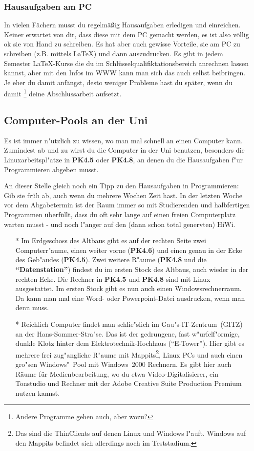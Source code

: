 \begin{center}
\subsubsection{Hausaufgaben am PC}
In vielen Fächern musst du regelmäßig Hausaufgaben erledigen und einreichen.
Keiner erwartet von dir, dass diese mit dem PC gemacht werden, es ist also
völlig ok sie von Hand zu schreiben. Es hat aber auch gewisse Vorteile, sie
am PC zu schreiben (z.B. mittels \LaTeX) und dann auszudrucken. Es gibt in
jedem Semester \LaTeX-Kurse die du im Schlüsselqualifiktationsbereich 
anrechnen lassen kannst, aber mit den Infos im WWW kann man sich das auch
selbst beibringen. Je eher du damit anfängst, desto weniger Probleme hast
du später, wenn du damit \footnote{Andere Programme gehen auch, aber
  wozu?} deine Abschlussarbeit aufsetzt.

\subsection{Computer-Pools an der Uni}
Es ist immer n"utzlich zu wissen, wo man mal schnell an einen Computer kann.
Zumindest ab und zu wirst du die Computer in der Uni benutzen, besonders
die Linuxarbeitspl"atze in \textbf{PK4.5} oder \textbf{PK4.8}, an denen du die Hausaufgaben f"ur
Programmieren abgeben musst.

{\small
An dieser Stelle gleich noch ein Tipp zu den Hausaufgaben in Programmieren:
Gib sie früh ab, auch wenn du mehrere Wochen Zeit hast. In der letzten Woche
vor dem Abgabetermin ist der Raum immer so mit Studierenden und halbfertigen
Programmen überfüllt, dass du oft sehr lange auf einen freien Computerplatz
warten musst - und noch l"anger auf den (dann schon total genervten) HiWi.
}

\begin{itemize}

\item[*] Im Erdgeschoss des Altbaus gibt es auf der rechten Seite zwei
Computerr"aume, einen weiter vorne (\textbf{PK4.6}) und einen genau in der Ecke
des Geb"audes (\textbf{PK4.5}). Zwei weitere R"aume (\textbf{PK4.8} und die
\textbf{"`Datenstation"'}) findest du im ersten Stock des Altbaus, auch wieder in
der rechten Ecke. Die Rechner in \textbf{PK4.5} und \textbf{PK4.8} sind mit Linux
ausgestattet. Im ersten Stock gibt es nun auch einen Windowsrechnerraum. Da kann man mal eine Word- oder
Powerpoint-Datei ausdrucken, wenn man denn muss.

\item[*] Reichlich Computer findet man schlie"slich im Gau"s-IT-Zentrum~(GITZ) an der
Hans-Sommer-Stra"se. Das ist der gedrungene, fast w"urfelf"ormige, dunkle
Klotz hinter dem Elektrotechnik-Hochhaus ("`E-Tower"'). Hier gibt es mehrere frei
zug"angliche R"aume mit Mappits\footnote{Das sind die ThinClients auf denen
Linux und Windows l"auft. Windows auf den Mappits befindet sich allerdings noch
im Teststadium.}, Linux PCs und auch einen gro"sen Windows"~Pool mit
Windows~2000 Rechnern. Es gibt hier auch Räume für Medienbearbeitung, wo du etwa
Video-Digitalisierer, ein Tonstudio und Rechner mit der Adobe Creative Suite 
Production Premium nutzen kannst.


\end{itemize}
\end{center}
